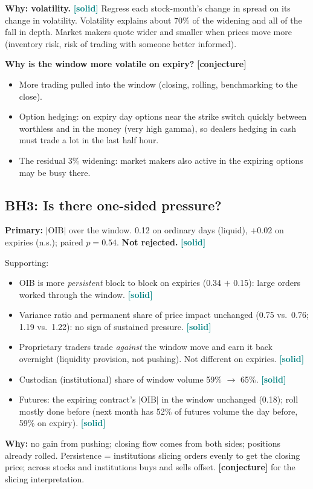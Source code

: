 \documentclass[11pt]{article}
\newcommand{\solid}{\textcolor{teal}{\textbf{[solid]}}}
\newcommand{\guess}{\textcolor{orange!80!black}{\textbf{[conjecture]}}}
\begin{document}
\textbf{Why: volatility.} \solid{} Regress each stock-month's change in spread on its change in
volatility. Volatility explains about 70\% of the widening and all of the fall in depth.
Market makers quote wider and smaller when prices move more (inventory risk, risk of trading
with someone better informed).

\textbf{Why is the window more volatile on expiry?} \guess
\begin{itemize}
  \item More trading pulled into the window (closing, rolling, benchmarking to the close).
  \item Option hedging: on expiry day options near the strike switch quickly between worthless
  and in the money (very high gamma), so dealers hedging in cash must trade a lot in the last
  half hour.
  \item The residual 3\% widening: market makers also active in the expiring options may be busy
  there.
\end{itemize}

\subsection*{BH3: Is there one-sided pressure?}
\textbf{Primary:} $|$OIB$|$ over the window. 0.12 on ordinary days (liquid), $+0.02$ on expiries
(n.s.); paired $p=0.54$. \textbf{Not rejected.} \solid

Supporting:
\begin{itemize}
  \item OIB is more \emph{persistent} block to block on expiries (0.34 $+$ 0.15): large orders
  worked through the window. \solid
  \item Variance ratio and permanent share of price impact unchanged (0.75 vs.\ 0.76; 1.19 vs.\
  1.22): no sign of sustained pressure. \solid
  \item Proprietary traders trade \emph{against} the window move and earn it back overnight
  (liquidity provision, not pushing). Not different on expiries. \solid
  \item Custodian (institutional) share of window volume 59\% $\to$ 65\%. \solid
  \item Futures: the expiring contract's $|$OIB$|$ in the window unchanged (0.18); roll mostly
  done before (next month has 52\% of futures volume the day before, 59\% on expiry). \solid
\end{itemize}
\textbf{Why:} no gain from pushing; closing flow comes from both sides; positions already
rolled. Persistence = institutions slicing orders evenly to get the closing price; across stocks
and institutions buys and sells offset. \guess{} for the slicing interpretation.
\end{document}
